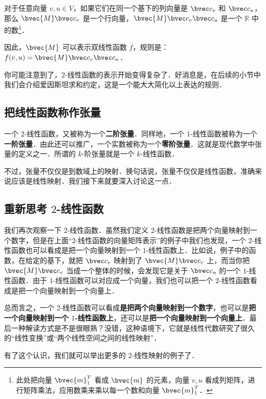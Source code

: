 对于任意向量 ${v}, {u}\in V$，如果它们在同一个基下的列向量是 $\bvec c_v$ 和 $\bvec c_u$，那么 $\bvec{M}\bvec c_v$ 是一个行向量，$\bvec{M}\bvec c_v\bvec c_u$ 是一个 $\mathbb{R}$ 中的数\footnote{此处把向量 $\bvec{m}_1^T$ 看成 $\bvec{m}$ 的元素，向量 ${v}, {u}$ 看成列矩阵，进行矩阵乘法，应用数乘来乘以每一个数和向量 $\bvec{m}_1^T$．}．

因此，$\bvec{M}$ 可以表示双线性函数 $f$，规则是：$f({v}, {u})=\bvec{M}\bvec c_v\bvec c_u$．

你可能注意到了，$2$-线性函数的表示开始变得复杂了．好消息是，在后续的小节中我们会介绍爱因斯坦求和约定，这是一个能大大简化以上表达的规则．

\subsection{把线性函数称作张量}

一个 $2$-线性函数，又被称为一个\textbf{二阶张量}．同样地，一个 $1$-线性函数被称为一个\textbf{一阶张量}．由此还可以推广，一个实数被称为一个\textbf{零阶张量}．这就是现代数学中张量的定义之一．所谓的 $k$-阶张量就是一个 $k$-线性函数．

不过，张量不仅仅是到数域上的映射．换句话说，张量不仅仅是线性函数，准确来说应该是线性映射．我们接下来就要深入讨论这一点．

\subsection{重新思考 $2$-线性函数}

我们再次观察一下 $2$-线性函数．虽然我们定义 $2$-线性函数是把两个向量映射到一个数字，但是在上面“$2$-线性函数的向量矩阵表示”的例子中我们也发现，一个 $2$-线性函数也可以看成是把一个向量映射到一个 $1$-线性函数上．比如说，例子中的函数，在给定的基下，就把 $\bvec c_v$ 映射到了 $\bvec{M}\bvec c_v$ 上，而当你把 $\bvec{M}\bvec c_v$ 当成一个整体的时候，会发现它是关于 $\bvec c_u$ 的一个 $1$-线性函数．由于 $1$-线性函数可以对应成一个向量，我们也可以把一个 $2$-线性函数看成是把一个向量映射到一个向量上．

总而言之，一个 $2$-线性函数可以看成\textbf{是把两个向量映射到一个数字}，也可以是\textbf{把一个向量映射到一个 $1$-线性函数上}，还可以是\textbf{把一个向量映射到一个向量上}．最后一种解读方式是不是很眼熟？没错，这种语境下，它就是线性代数研究了很久的“线性变换”或“两个线性空间之间的线性映射”．

有了这个认识，我们就可以举出更多的 $2$-线性映射的例子了．

